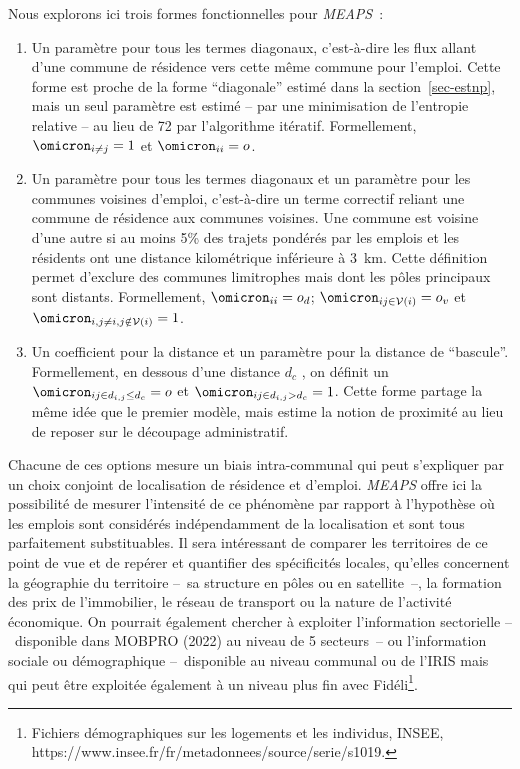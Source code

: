\documentclass[
  10pt,
  a4paper,
  numbers=noendperiod,
  DIV=9]{scrartcl}
\begin{document}
Nous explorons ici trois formes fonctionnelles pour \emph{MEAPS}~:

\begin{enumerate}
\def\labelenumi{\arabic{enumi}.}
\item
  Un paramètre pour tous les termes diagonaux, c'est-à-dire les flux
  allant d'une commune de résidence vers cette même commune pour
  l'emploi. Cette forme est proche de la forme ``diagonale'' estimé dans
  la section~\ref{sec-estnp}, mais un seul paramètre est estimé -- par
  une minimisation de l'entropie relative -- au lieu de 72 par
  l'algorithme itératif. Formellement, \(\omicron_{i \neq j}=1\) et
  \(\omicron_{ii} = o\).
\item
  Un paramètre pour tous les termes diagonaux et un paramètre pour les
  communes voisines d'emploi, c'est-à-dire un terme correctif reliant
  une commune de résidence aux communes voisines. Une commune est
  voisine d'une autre si au moins 5\% des trajets pondérés par les
  emplois et les résidents ont une distance kilométrique inférieure à
  3~km. Cette définition permet d'exclure des communes limitrophes mais
  dont les pôles principaux sont distants. Formellement,
  \(\omicron_{ii} = o_d\); \(\omicron_{ij\in \mathcal{V}(i)} = o_v\) et
  \(\omicron_{i, j \neq i, j \notin \mathcal{V}(i)} = 1\).
\item
  Un coefficient pour la distance et un paramètre pour la distance de
  ``bascule''. Formellement, en dessous d'une distance \(d_c\) , on
  définit un \(\omicron_{ij \in d_{i,j} \leq d_c} = o\) et
  \(\omicron_{ij \in d_{i,j} > d_c} = 1\). Cette forme partage la même
  idée que le premier modèle, mais estime la notion de proximité au lieu
  de reposer sur le découpage administratif.
\end{enumerate}

Chacune de ces options mesure un biais intra-communal qui peut
s'expliquer par un choix conjoint de localisation de résidence et
d'emploi. \emph{MEAPS} offre ici la possibilité de mesurer l'intensité
de ce phénomène par rapport à l'hypothèse où les emplois sont considérés
indépendamment de la localisation et sont tous parfaitement
substituables. Il sera intéressant de comparer les territoires de ce
point de vue et de repérer et quantifier des spécificités locales,
qu'elles concernent la géographie du territoire --~sa structure en pôles
ou en satellite~--, la formation des prix de l'immobilier, le réseau de
transport ou la nature de l'activité économique. On pourrait également
chercher à exploiter l'information sectorielle --~disponible dans MOBPRO
(2022) au niveau de 5 secteurs~-- ou l'information sociale ou
démographique --~disponible au niveau communal ou de l'IRIS mais qui
peut être exploitée également à un niveau plus fin avec
Fidéli\footnote{Fichiers démographiques sur les logements et les
  individus, INSEE,
  https://www.insee.fr/fr/metadonnees/source/serie/s1019.}.
\end{document}
